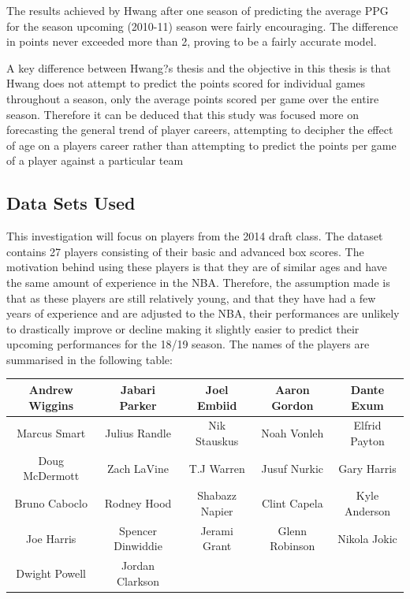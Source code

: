 \documentclass[a4paper,11pt,twoside]{article}
\begin{document}
The results achieved by Hwang after one season of predicting the average PPG for the season upcoming (2010-11) season were fairly encouraging. The difference in points never exceeded more than 2, proving to be a fairly accurate model.

A key difference between Hwang?s thesis and the objective in this thesis is that Hwang does not attempt to predict the points scored for individual games throughout a season, only the average points scored per game over the entire season. Therefore it can be deduced that this study was focused more on forecasting the general trend of player careers, attempting to decipher the effect of age on a players career rather than attempting to predict the points per game of a player against a particular team

\subsection{Data Sets Used}
This investigation will focus on players from the 2014 draft class. The dataset contains 27 players consisting of their basic and advanced box scores. The motivation behind using these players is that they are of similar ages and have the same amount of experience in the NBA. Therefore, the assumption made is that as these players are still relatively young, and that they have had a few years of experience and are adjusted to the NBA, their performances are unlikely to drastically improve or decline making it slightly easier to predict their upcoming performances for the 18/19 season. The names of the players are summarised in the following table:

\vspace{5mm}
\begin{center}
\begin{tabular}{ ccccc } 
 \hline
Andrew Wiggins & Jabari Parker & Joel Embiid & Aaron  Gordon& Dante Exum \\ 
 \hline
Marcus Smart & Julius Randle & Nik Stauskus & Noah Vonleh & Elfrid Payton \\ 
 \hline
 Doug McDermott & Zach LaVine & T.J Warren & Jusuf Nurkic & Gary Harris\\
 \hline
 Bruno Caboclo & Rodney Hood & Shabazz Napier & Clint Capela & Kyle Anderson\\
 \hline 
 Joe Harris & Spencer Dinwiddie & Jerami Grant & Glenn Robinson & Nikola Jokic\\
 \hline
 Dwight Powell & Jordan Clarkson\\
\hline
\end{tabular}
\end{center}
\end{document}
